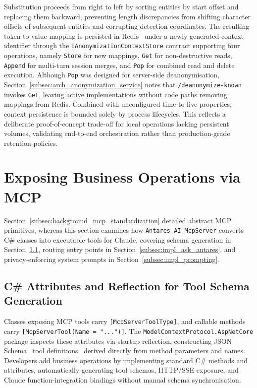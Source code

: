 Substitution proceeds from right to left by sorting entities by start offset and replacing them backward, preventing length discrepancies from shifting character offsets of subsequent entities and corrupting detection coordinates. The resulting token-to-value mapping is persisted in Redis~\cite{redis2009} under a newly generated context identifier through the \texttt{IAnonymizationContextStore} contract supporting four operations, namely \texttt{Store} for new mappings, \texttt{Get} for non-destructive reads, \texttt{Append} for multi-turn session merges, and \texttt{Pop} for combined read and delete execution. Although \texttt{Pop} was designed for server-side deanonymisation, Section~\ref{subsec:arch_anonymization_service} notes that \texttt{/deanonymize-known} invokes \texttt{Get}, leaving active implementations without code paths removing mappings from Redis. Combined with unconfigured time-to-live properties, context persistence is bounded solely by process lifecycles. This reflects a deliberate proof-of-concept trade-off for local operations lacking persistent volumes, validating end-to-end orchestration rather than production-grade retention policies.

\section{Exposing Business Operations via MCP}
\label{sec:impl_mcp_tools}

Section~\ref{subsec:background_mcp_standardization} detailed abstract MCP primitives, whereas this section examines how \texttt{Antares\_AI\_McpServer} converts C\# classes into executable tools for Claude, covering schema generation in Section~\ref{subsec:impl_csharp_reflection}, routing entry points in Section~\ref{subsec:impl_ask_antares}, and privacy-enforcing system prompts in Section~\ref{subsec:impl_prompting}.

\subsection{C\# Attributes and Reflection for Tool Schema Generation}
\label{subsec:impl_csharp_reflection}

Classes exposing MCP tools carry \texttt{[McpServerToolType]}, and callable methods carry \texttt{[McpServerTool(Name = "...")]}. The \texttt{ModelContextProtocol.AspNetCore} package inspects these attributes via startup reflection, constructing JSON Schema~\cite{jsonschema2020} tool definitions~\cite{anthropic2024mcp} derived directly from method parameters and names. Developers add business operations by implementing standard C\# methods and attributes, automatically generating tool schemas, HTTP/SSE exposure, and Claude function-integration bindings without manual schema synchronisation.

